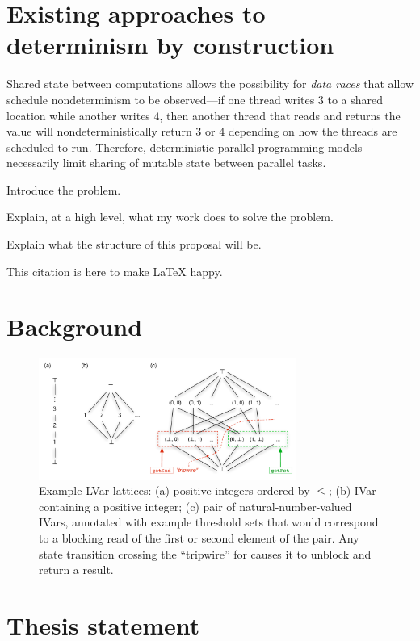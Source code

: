 \documentclass{article}
\begin{document}
\section{Existing approaches to determinism by construction}

Shared state between computations allows the possibility for
\emph{data races} that allow schedule nondeterminism to be
observed---if one thread writes $3$ to a shared location while another
writes $4$, then another thread that reads and returns the value will
nondeterministically return $3$ or $4$ depending on how the threads
are scheduled to run.  Therefore, deterministic parallel programming
models necessarily limit sharing of mutable state between parallel
tasks.


Introduce the problem.

Explain, at a high level, what my work does to solve the problem.

Explain what the structure of this proposal will be.

This citation \cite{LVars-TR} is here to make LaTeX happy.

\section{Background}

\begin{figure}
\centering
\includegraphics[width=0.75\textwidth]{figures/example-lvar-lattices.pdf} 
  \caption{Example LVar lattices: (a) positive integers ordered by
    $\leq$; (b) IVar containing a positive integer; (c) pair of
    natural-number-valued IVars, annotated with example threshold sets
    that would correspond to a blocking read of the first or second
    element of the pair.  Any state transition crossing the
    ``tripwire'' for  causes it to unblock and return
    a result.}

  \label{f:lattice-examples}
\end{figure}

\section{Thesis statement}
\end{document}
